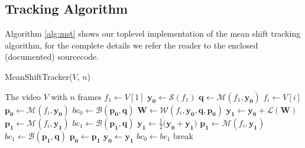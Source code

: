 \documentclass[11pt]{article}
\begin{document}
\subsection{Tracking Algorithm}
Algorithm \ref{alg:mst} shows our toplevel implementation of the mean shift
tracking algorithm, for the complete details we refer the reader to the
enclosed (documented) sourcecode.
\begin{algorithm}
	\caption{MeanShiftTracker($V$, $n$)}
	\begin{algorithmic}[1]
	\REQUIRE The video $V$ with $n$ frames
	\STATE $f_1 \leftarrow V[1]$ 
	\STATE $\mathbf{y_0} \leftarrow \mathcal{S}(f_1)$ 
	\STATE $\mathbf{q} \leftarrow \mathcal{M}(f_1, \mathbf{y_0})$ 
		\STATE $f_i \leftarrow V[i]$
		\STATE $\mathbf{p_0} \leftarrow \mathcal{M}(f_i, \mathbf{y_0})$
		\STATE $bc_0 \leftarrow \mathcal{B}(\mathbf{p_0}, \mathbf{q})$ 
			\STATE $\mathbf{W} \leftarrow \mathcal{W}(f_i, \mathbf{y_0}, \mathbf{q}, \mathbf{p_0})$ 
			\STATE $\mathbf{y_1} \leftarrow \mathbf{y_0} + \mathcal{L}(\mathbf{W})$ 
			\STATE $\mathbf{p_1} \leftarrow \mathcal{M}(f_i, \mathbf{y_1})$
			\STATE $bc_1 \leftarrow \mathcal{B}(\mathbf{p_1}, \mathbf{q})$
				\STATE $\mathbf{y_1} \leftarrow \frac{1}{2} \dot (\mathbf{y_0} + \mathbf{y_1})$ 
				\STATE $\mathbf{p_1} \leftarrow \mathcal{M}(f_i, \mathbf{y_1})$
				\STATE $bc_1 \leftarrow \mathcal{B}(\mathbf{p_1}, \mathbf{q})$
			\ENDWHILE
			\STATE $\mathbf{p_0} \leftarrow \mathbf{p_1}$
			\STATE $\mathbf{y_0} \leftarrow \mathbf{y_1}$
			\STATE $bc_0 \leftarrow bc_1$
				\STATE break 
			\ENDIF
		\ENDWHILE
	\ENDFOR
	\medskip
	\end{algorithmic}
\label{alg:mst}
\end{algorithm}
\end{document}
